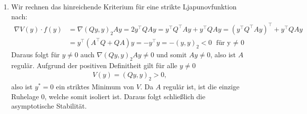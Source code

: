 \begin{solution}
\begin{enumerate}[label = \textbf{\alph*)}]
  \item Wir rechnen das hinreichende Kriterium für eine strikte Ljapunovfunktion nach:
  \begin{align*}
    \nabla V(y) \cdot f(y) &= \nabla (Qy,y)_2 Ay = 2y^{\top}Q Ay =
    y^{\top}Q^{\top} Ay + y^{\top}Q Ay = (y^{\top}Q^{\top} Ay)^{\top} + y^{\top}Q Ay\\
    &= y^{\top}(A^{\top}Q + QA)y = - y^{\top}y = -(y,y)_2 < 0 \text{ für y $\neq$ 0}
  \end{align*}
  Daraus folgt für $y \neq 0$ auch $\nabla (Qy,y)_2 Ay \neq 0$ und somit $Ay \neq 0$,
  also ist $A$ regulär.
  Aufgrund der positiven Definitheit gilt für alle $y \neq 0$
  \begin{align*}
    V(y) = (Qy,y)_2 > 0,
  \end{align*}
  also ist $y^* = 0$ ein striktes Minimum von $V$.
  Da $A$ regulär ist, ist die einzige Ruhelage $0$, welche somit isoliert ist.
  Daraus folgt schließlich die asymptotische Stabilität.
\end{enumerate}
\end{solution}
